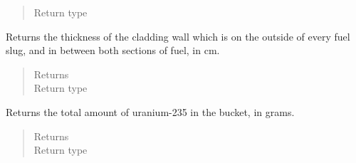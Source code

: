 \documentclass[letterpaper,10pt,openany,oneside,english]{sphinxmanual}
\begin{document}
\begin{fulllineitems}
\begin{fulllineitems}
\begin{quote}
\begin{description}
\item[{Return type}] \leavevmode
{}

\end{description}\end{quote}

\end{fulllineitems}


\begin{fulllineitems}
\label{\detokenize{support_rst/fuel_bucket:fuel_bucket.FuelBucket.cladding_wall_thickness}}
Returns the thickness of the cladding wall which is on the outside of
every fuel slug, and in between both sections of fuel, in cm.
\begin{quote}\begin{description}
\item[{Returns}] \leavevmode
{}

\item[{Return type}] \leavevmode
{}

\end{description}\end{quote}

\end{fulllineitems}


\begin{fulllineitems}
\label{\detokenize{support_rst/fuel_bucket:fuel_bucket.FuelBucket.fresh_u235_mass}}
Returns the total amount of uranium-235 in the bucket, in grams.
\begin{quote}\begin{description}
\item[{Returns}] \leavevmode
{}

\item[{Return type}] \leavevmode
{}

\end{description}\end{quote}


\end{fulllineitems}
\end{fulllineitems}
\end{document}
